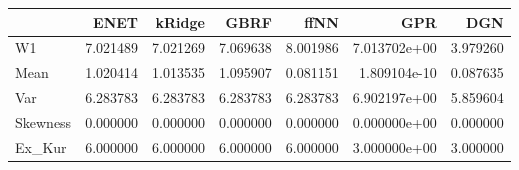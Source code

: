 \begin{tabular}{lrrrrrr}
\toprule
{} &      ENET &    kRidge &      GBRF &      ffNN &           GPR &       DGN \\
\midrule
W1       &  7.021489 &  7.021269 &  7.069638 &  8.001986 &  7.013702e+00 &  3.979260 \\
Mean     &  1.020414 &  1.013535 &  1.095907 &  0.081151 &  1.809104e-10 &  0.087635 \\
Var      &  6.283783 &  6.283783 &  6.283783 &  6.283783 &  6.902197e+00 &  5.859604 \\
Skewness &  0.000000 &  0.000000 &  0.000000 &  0.000000 &  0.000000e+00 &  0.000000 \\
Ex\_Kur   &  6.000000 &  6.000000 &  6.000000 &  6.000000 &  3.000000e+00 &  3.000000 \\
\bottomrule
\end{tabular}
